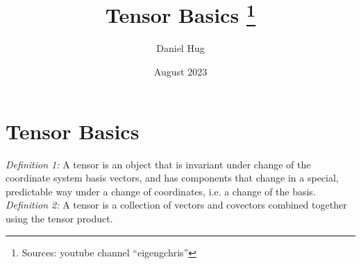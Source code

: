 \documentclass[12pt,oneside,a4paper]{article}
\title{Tensor Basics \footnote{Sources: youtube channel ``eigengchris''}}
\author{Daniel Hug}
\date{August 2023}
\begin{document}
\maketitle


\setlength{\parindent}{0pt}

\section{Tensor Basics}

\emph{Definition 1:} A tensor is an object that is invariant under change of the
coordinate system basis vectors, and has components that change in a special, predictable
way under a change of coordinates, i.e. a change of the basis. \\

\emph{Definition 2:} A tensor is a collection of vectors and covectors combined together
using the tensor product. \\

\newpage







\end{document}
